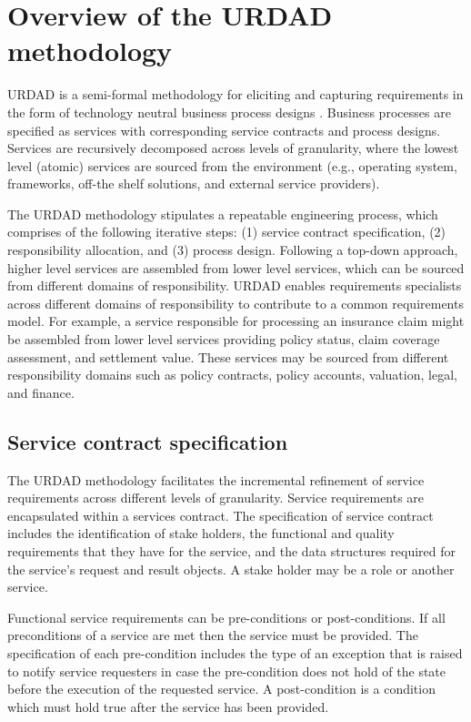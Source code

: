 \section{Overview of the URDAD methodology \label{sec:urdadMethodology}}

URDAD is a semi-formal methodology for eliciting and capturing requirements in the form of technology neutral business process designs \cite{solms_urdad_2010}. Business processes are specified as services with corresponding service contracts and process designs. Services are recursively decomposed across levels of granularity, where the lowest level (atomic) services are sourced from the environment (e.g., operating system, frameworks, off-the shelf solutions, and external service providers). 

The URDAD methodology stipulates a repeatable engineering process, which comprises of the following iterative steps: (1) service contract specification, (2) responsibility allocation, and (3) process design. Following a top-down approach, higher level services are assembled from lower level services, which can be sourced from different domains of responsibility. URDAD enables requirements specialists across different domains of responsibility to contribute to a common requirements model. For example, a service responsible for processing an insurance claim might be assembled from lower level services providing policy status, claim coverage assessment, and settlement value. These services may be sourced from different responsibility domains such as policy contracts, policy accounts, valuation, legal, and finance. 

\subsection{Service contract specification}

The URDAD methodology facilitates the incremental refinement of service requirements across different levels of granularity. Service requirements are encapsulated within a services contract. The specification of service contract includes the identification of stake holders, the functional and quality requirements that they have for the service, and the data structures required for the service's request and result objects. A stake holder may be a role or another service.

Functional service requirements can be pre-conditions or post-conditions. If all preconditions of a service are met then the service must be provided. The specification of each pre-condition includes the type of an exception that is raised to notify service requesters in case the pre-condition does not hold of the state before the execution of the requested service. A post-condition is a condition which must hold true after the service has been provided.


